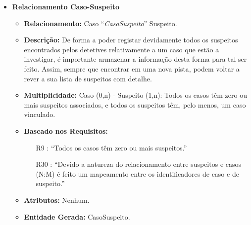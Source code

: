 \documentclass[a4paper,12pt]{scrreprt}
\begin{document}
\begin{itemize}
        \clearpage
        
        \item\textbf{Relacionamento Caso-Suspeito}
        \begin{itemize}
            \item\textbf{Relacionamento:} Caso “\textit{CasoSuspeito}” Suspeito.
            \item\textbf{Descrição:} De forma a poder registar devidamente todos os suspeitos encontrados pelos detetives relativamente a um caso que estão a investigar, é importante armazenar a informação desta forma para tal ser feito. Assim, sempre que encontrar em uma nova pista, podem voltar a rever a sua lista de suspeitos com detalhe.
            \item\textbf{Multiplicidade:} Caso (0,n) - Suspeito (1,n): Todos os casos têm zero ou mais suspeitos associados, e todos os suspeitos têm, pelo menos, um caso vinculado.
            \item\textbf{Baseado nos Requisitos:}
            \begin{itemize}
                \item [R9]: “Todos os casos têm zero ou mais suspeitos.”
                \item [R30]: “Devido a natureza do relacionamento entre suspeitos e casos (N:M) é feito um mapeamento entre os identificadores de caso e de suspeito.”
            \end{itemize}
            \item\textbf{Atributos:} Nenhum.
            \item\textbf{Entidade Gerada:} CasoSuspeito.
        \end{itemize}

        \vspace{0.75cm}
    

\end{itemize}
\end{document}
